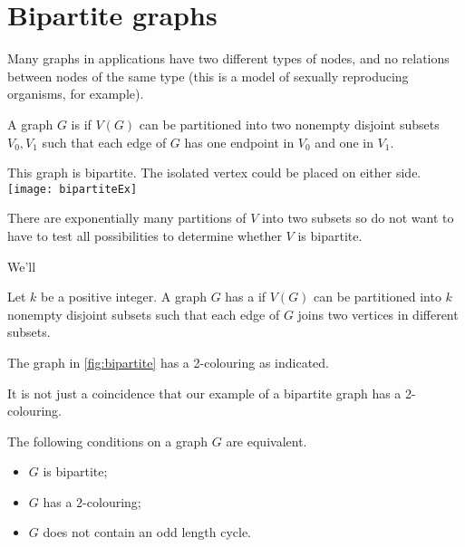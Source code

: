 \chapter{Bipartite graphs}



Many graphs in applications have two different types of nodes, and no
relations between nodes of the same type (this is a model of sexually
reproducing organisms, for example).

\begin{Definition}
A graph $G$ is  if $V(G)$  can be partitioned into
two nonempty disjoint subsets $V_0, V_1$ such that each edge of $G$
has one endpoint in $V_0$ and one in $V_1$.
\end{Definition}

\begin{Boxample}[0]
This graph is bipartite.  The isolated
vertex could be placed on either side.
\vspace{3mm}\\
\texttt{[image: bipartiteEx]} 
\end{Boxample}


There are exponentially many partitions of $V$ into two subsets so
do not want to have to test all possibilities to determine whether $V$ is bipartite.

We'll 
\begin{Definition}
Let $k$ be a positive integer. A graph $G$ has a 
if $V(G)$ can be partitioned into $k$ nonempty disjoint subsets such
that each edge of $G$ joins two vertices in different subsets.
\end{Definition}

\begin{Example}
The graph in \cref{fig:bipartite} has a 2-colouring as indicated.
\end{Example}

It is not just a coincidence that our example of a bipartite graph
has a 2-colouring.

\begin{Theorem} 
The following conditions on a graph $G$ are equivalent.
\begin{itemize}
\item
$G$ is bipartite;
\item
$G$ has a $2$-colouring;
\item
$G$ does not contain an odd length cycle.
\end{itemize}
\end{Theorem}


